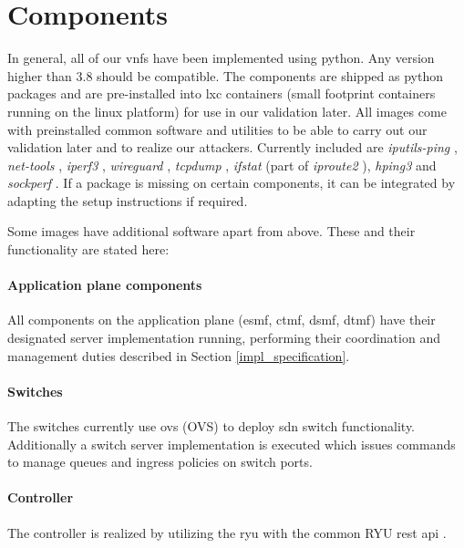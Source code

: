 \newpage


\section{Components}
In general, all of our \acrshort{vnf}s have been implemented using python. Any version higher than 3.8 should be compatible. The components are shipped as python packages and are pre-installed into \acrshort{lxc} containers (small footprint containers running on the linux platform) \cite{lxc} for use in our validation later. All images come with preinstalled common software and utilities to be able to carry out our validation later and to realize our attackers. Currently included are \textit{iputils-ping} \cite{iputils}, \textit{net-tools} \cite{net-tools}, \textit{iperf3} \cite{iperf3}, \textit{\gls{wireguard}} \cite{wireguard}, \textit{tcpdump} \cite{tcpdump}, \textit{ifstat} (part of \textit{iproute2} \cite{iproute2}), \textit{hping3} \cite{hping3} and \textit{sockperf} \cite{sockperf}. If a package is missing on certain components, it can be integrated by adapting the setup instructions if required.

Some images have additional software apart from above. These and their functionality are stated here:

\paragraph{Application plane components} All components on the application plane (\acrshort{esmf}, \acrshort{ctmf}, \acrshort{dsmf}, \acrshort{dtmf}) have their designated server implementation running, performing their coordination and management duties described in Section \ref{impl_specification}.

\paragraph{Switches} The switches currently use \Gls{ovs} (OVS) \cite{openvswitch} to deploy \acrshort{sdn} switch functionality. Additionally a switch server implementation is executed which issues commands to manage queues and ingress policies on switch ports.

\paragraph{Controller} The controller is realized by utilizing the \Gls{ryu} \cite{ryu} with the common RYU \acrshort{rest} \acrshort{api} \cite{ryu-rest}.


